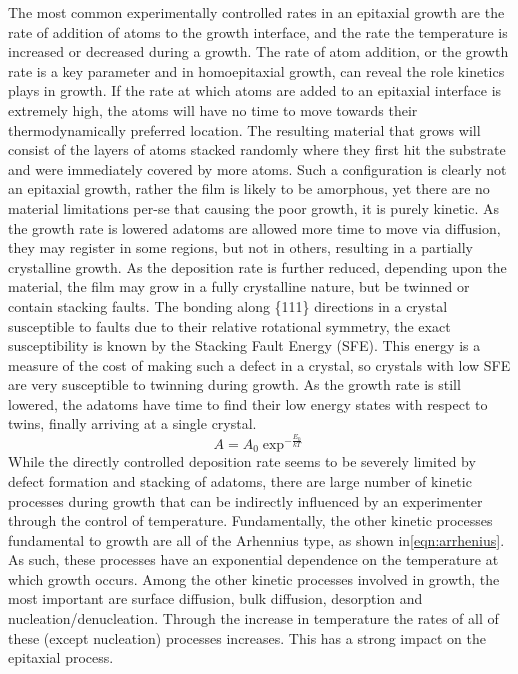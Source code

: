 The most common experimentally controlled rates in an epitaxial growth are the rate of addition of atoms to the growth interface, and the rate the temperature is increased or decreased during a growth. The rate of atom addition, or the growth rate is a key parameter and in homoepitaxial growth, can reveal the role kinetics plays in growth. If the rate at which atoms are added to an epitaxial interface is extremely high, the atoms will have no time to move towards their thermodynamically preferred location. The resulting material that grows will consist of the layers of atoms stacked randomly where they first hit the substrate and were immediately covered by more atoms. Such a configuration is clearly not an epitaxial growth, rather the film is likely to be amorphous, yet there are no material limitations per-se that causing the poor growth, it is purely kinetic. As the growth rate is lowered adatoms are allowed more time to move via diffusion, they may register in some regions, but not in others, resulting in a partially crystalline growth. As the deposition rate is further reduced, depending upon the material, the film may grow in a fully crystalline nature, but be twinned or contain stacking faults. The bonding along \{111\} directions in a crystal susceptible to faults due to their relative rotational symmetry, the exact susceptibility is known by the Stacking Fault Energy (SFE)\cite{stacking-fault-energy}. This energy is a measure of the cost of making such a defect in a crystal, so crystals with low SFE are very susceptible to twinning during growth. As the growth rate is still lowered, the adatoms have time to find their low energy states with respect to twins, finally arriving at a single crystal.
\begin{equation}
A = A_0 \exp^{-\frac{E_0}{kT}} \label{eqn:arrhenius}
\end{equation}
While the directly controlled deposition rate seems to be severely limited by defect formation and stacking of adatoms, there are large number of kinetic processes during growth that can be indirectly influenced by an experimenter through the control of temperature. Fundamentally, the other kinetic processes fundamental to growth are all of the Arhennius type, as shown in\cref{eqn:arrhenius}. As such, these processes have an exponential dependence on the temperature at which growth occurs. Among the other kinetic processes involved in growth, the most important are surface diffusion, bulk diffusion, desorption and nucleation/denucleation. Through the increase in temperature the rates of all of these (except nucleation) processes increases. This has a strong impact on the epitaxial process. 

